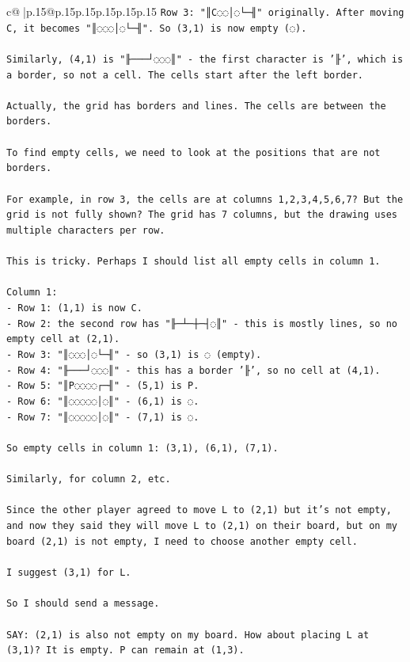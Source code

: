 \documentclass{article}
\begin{document}
{\begin{supertabular}{c@{$\;$}|p{.15\linewidth}@{}p{.15\linewidth}p{.15\linewidth}p{.15\linewidth}p{.15\linewidth}p{.15\linewidth}}
{{{\texttt{Row 3: "║C◌◌│◌└─╢" originally. After moving C, it becomes "║◌◌◌│◌└─╢". So (3,1) is now empty (◌).} \\
\\ 
\texttt{Similarly, (4,1) is "╟───┘◌◌◌║" {-} the first character is '╟', which is a border, so not a cell. The cells start after the left border.} \\
\\ 
\texttt{Actually, the grid has borders and lines. The cells are between the borders.} \\
\\ 
\texttt{To find empty cells, we need to look at the positions that are not borders.} \\
\\ 
\texttt{For example, in row 3, the cells are at columns 1,2,3,4,5,6,7? But the grid is not fully shown? The grid has 7 columns, but the drawing uses multiple characters per row.} \\
\\ 
\texttt{This is tricky. Perhaps I should list all empty cells in column 1.} \\
\\ 
\texttt{Column 1:} \\
\texttt{{-} Row 1: (1,1) is now C.} \\
\texttt{{-} Row 2: the second row has "╟─┴─┼─┤◌║" {-} this is mostly lines, so no empty cell at (2,1).} \\
\texttt{{-} Row 3: "║◌◌◌│◌└─╢" {-} so (3,1) is ◌ (empty).} \\
\texttt{{-} Row 4: "╟───┘◌◌◌║" {-} this has a border '╟', so no cell at (4,1).} \\
\texttt{{-} Row 5: "║P◌◌◌◌┌─╢" {-} (5,1) is P.} \\
\texttt{{-} Row 6: "║◌◌◌◌◌│◌║" {-} (6,1) is ◌.} \\
\texttt{{-} Row 7: "║◌◌◌◌◌│◌║" {-} (7,1) is ◌.} \\
\\ 
\texttt{So empty cells in column 1: (3,1), (6,1), (7,1).} \\
\\ 
\texttt{Similarly, for column 2, etc.} \\
\\ 
\texttt{Since the other player agreed to move L to (2,1) but it's not empty, and now they said they will move L to (2,1) on their board, but on my board (2,1) is not empty, I need to choose another empty cell.} \\
\\ 
\texttt{I suggest (3,1) for L.} \\
\\ 
\texttt{So I should send a message.} \\
\\ 
\texttt{SAY: (2,1) is also not empty on my board. How about placing L at (3,1)? It is empty. P can remain at (1,3).} \\
            }
        }
    }
     \\ \\


\end{supertabular}}
\end{document}
